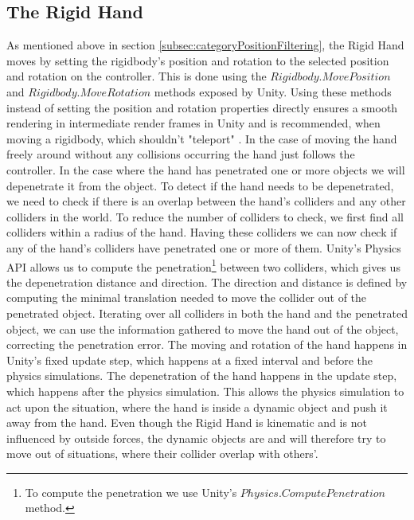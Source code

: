 \subsection{The Rigid Hand}
\label{subsec:rigidHand}
As mentioned above in section \ref{subsec:categoryPositionFiltering}, the Rigid Hand moves by setting the rigidbody's position and rotation to the selected position and rotation on the controller. This is done using the $Rigidbody.MovePosition$ and $Rigidbody.MoveRotation$ methods exposed by Unity. Using these methods instead of setting the position and rotation properties directly ensures a smooth rendering in intermediate render frames in Unity and is recommended, when moving a rigidbody, which shouldn't "teleport" \parencite{UnityMovePosition2017}. In the case of moving the hand freely around without any collisions occurring the hand just follows the controller. In the case where the hand has penetrated one or more objects we will depenetrate it from the object. To detect if the hand needs to be depenetrated, we need to check if there is an overlap between the hand's colliders and any other colliders in the world. To reduce the number of colliders to check, we first find all colliders within a radius of the hand. Having these colliders we can now check if any of the hand's colliders have penetrated one or more of them. Unity's Physics API allows us to compute the penetration\footnote{To compute the penetration we use Unity's $Physics.ComputePenetration$ method.} between two colliders, which gives us the depenetration distance and direction. The direction and distance is defined by computing the minimal translation needed to move the collider out of the penetrated object. Iterating over all colliders in both the hand and the penetrated object, we can use the information gathered to move the hand out of the object, correcting the penetration error. The moving and rotation of the hand happens in Unity's fixed update step, which happens at a fixed interval and before the physics simulations. The depenetration of the hand happens in the update step, which happens after the physics simulation. This allows the physics simulation to act upon the situation, where the hand is inside a dynamic object and push it away from the hand. Even though the Rigid Hand is kinematic and is not influenced by outside forces, the dynamic objects are and will therefore try to move out of situations, where their collider overlap with others'.

